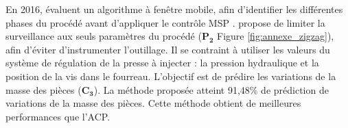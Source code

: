 En 2016, \citeauthor{liu_window-based_2016} évaluent un algorithme à fenêtre mobile, afin d’identifier les différentes phases du procédé avant d’appliquer le contrôle MSP \cite{liu_window-based_2016}.
\citeauthor{zhang_statistical_2016} \cite{zhang_statistical_2016} propose de limiter la surveillance aux seuls paramètres du procédé ($\boldsymbol{P_2}$ Figure \ref{fig:annexe_zigzag}), afin d'éviter d'instrumenter l'outillage.
Il se contraint à utiliser les valeurs du système de régulation de la presse à injecter : la pression hydraulique et la position de la vis dans le fourreau.
L’objectif est de prédire les variations de la masse des pièces ($\boldsymbol{C_3}$).
La méthode proposée atteint 91,48\% de prédiction de variations de la masse des pièces.
Cette méthode obtient de meilleures performances que l'ACP.




